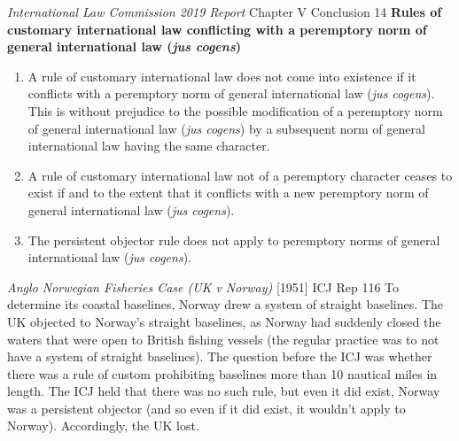 \begin{conventiondetails}{\textit{International Law Commission 2019 Report} Chapter V Conclusion 14}\label{report:2019 ILC Conc. 14}
    \flushleft
    \textbf{Rules of customary international law conflicting with a peremptory norm of general international law (\textit{jus cogens})}

    \begin{enumerate}
        \item A rule of customary international law does not come into existence if it conflicts with a peremptory norm of general international law (\textit{jus cogens}). This is without prejudice to the possible modification of a peremptory norm of general international law (\textit{jus cogens}) by a subsequent norm of general international law having the same character.
        \item A rule of customary international law not of a peremptory character ceases to exist if and to the extent that it conflicts with a new peremptory norm of general international law (\textit{jus cogens}).
        \item The persistent objector rule does not apply to peremptory norms of general international law (\textit{jus cogens}).
    \end{enumerate}
\end{conventiondetails}

\begin{casedetails}{\textit{Anglo Norwegian Fisheries Case (UK v Norway)} [1951] ICJ Rep 116}\label{case:UK v Norway Fisheries}
    \flushleft
    To determine its coastal baselines, Norway drew a system of straight baselines. The UK objected to Norway's straight baselines, as Norway had suddenly closed the waters that were open to British fishing vessels (the regular practice was to not have a system of straight baselines). The question before the ICJ was whether there was a rule of custom prohibiting baselines more than 10 nautical miles in length. The ICJ held that there was no such rule, but even it did exist, Norway was a persistent objector (and so even if it did exist, it wouldn't apply to Norway). Accordingly, the UK lost.
\end{casedetails}

